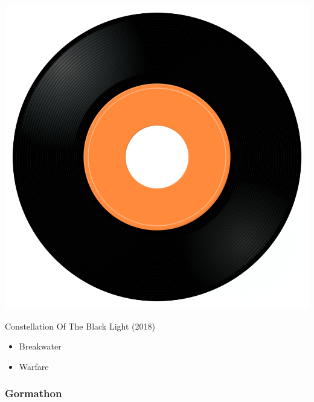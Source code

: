 \begin{minipage}[t]{0.25\textwidth}\vspace{0pt}
\captionsetup{type=figure}
\includegraphics[width=\textwidth]{Images/cover.png}
\caption*{Constellation Of The Black Light (2018)}
\end{minipage}
\begin{minipage}[t]{0.25\textwidth}\vspace{0pt}
\begin{itemize}[nosep,leftmargin=1em,labelwidth=*,align=left]
	\setlength{\itemsep}{0pt}
	\item Breakwater
	\item Warfare
\end{itemize}
\end{minipage}


\subsubsection{Gormathon}

